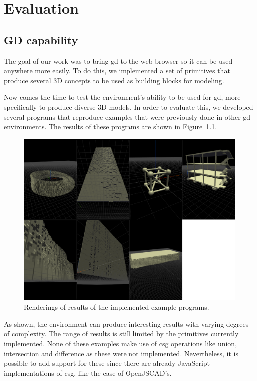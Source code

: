 
\chapter{Evaluation}
\label{chapter:evaluation}




\section{GD capability}
The goal of our work was to bring \gls{gd} to the web browser so it can be used anywhere more easily.
To do this, we implemented a set of primitives that produce several 3D concepts to be used as building blocks for modeling.

Now comes the time to test the environment's ability to be used for \gls{gd}, more specifically to produce diverse 3D models.
In order to evaluate this, we developed several programs that reproduce examples that were previously done in other \gls{gd} environments.
The results of these programs are shown in Figure~\ref{fig:all:examples}.

\begin{figure}
  \centering
  \includegraphics[width=12cm]{./images/all_examples}
  \caption{Renderings of results of the implemented example programs.}
  \label{fig:all:examples}
\end{figure}

As shown, the environment can produce interesting results with varying degrees of complexity.
The range of results is still limited by the primitives currently implemented.
None of these examples make use of \gls{csg} operations like union, intersection and difference as these were not implemented.
Nevertheless, it is possible to add support for these since there are already JavaScript implementations of \gls{csg}, like the case of OpenJSCAD's.


